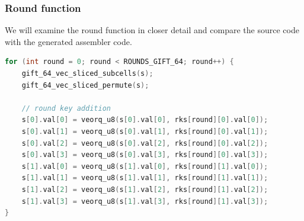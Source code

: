 \subsubsection{Round function}
We will examine the round function in closer detail and compare the source code
with the generated assembler code.




\begin{lstlisting}[language=c, caption={Round function}]
for (int round = 0; round < ROUNDS_GIFT_64; round++) {
    gift_64_vec_sliced_subcells(s);
    gift_64_vec_sliced_permute(s);

    // round key addition
    s[0].val[0] = veorq_u8(s[0].val[0], rks[round][0].val[0]);
    s[0].val[1] = veorq_u8(s[0].val[1], rks[round][0].val[1]);
    s[0].val[2] = veorq_u8(s[0].val[2], rks[round][0].val[2]);
    s[0].val[3] = veorq_u8(s[0].val[3], rks[round][0].val[3]);
    s[1].val[0] = veorq_u8(s[1].val[0], rks[round][1].val[0]);
    s[1].val[1] = veorq_u8(s[1].val[1], rks[round][1].val[1]);
    s[1].val[2] = veorq_u8(s[1].val[2], rks[round][1].val[2]);
    s[1].val[3] = veorq_u8(s[1].val[3], rks[round][1].val[3]);
}
\end{lstlisting}

